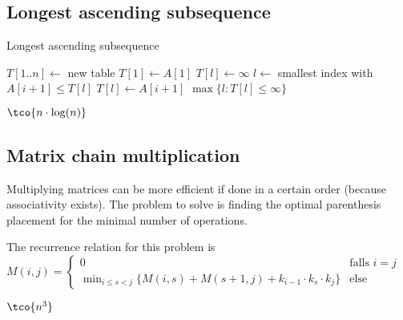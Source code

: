 \subsection{Longest ascending subsequence}
\begin{algorithm}
    \begin{spacing}{1.2}
        \caption{Longest ascending subsequence}
        \begin{algorithmic}[1]
            \State $T[1..n] \gets$ new table
            \State $T[1] \gets A[1]$
                $T[l] \gets \infty$
            \EndFor
                \State $l \gets$ smallest index with $A[i + 1] \leq T[l]$
                \State $T[l] \gets A[i + 1]$
            \EndFor
            \State \Return $\max\{l : T[l] \leq \infty\}$
        \end{algorithmic}
    \end{spacing}
\end{algorithm}

\timecomplexity $\tco{n \cdot \log(n)}$


\subsection{Matrix chain multiplication}
Multiplying matrices can be more efficient if done in a certain order (because associativity exists). The problem to solve is finding the optimal parenthesis placement for the minimal number of operations. 

The recurrence relation for this problem is $M(i, j) = \begin{cases}
    0 & \text{falls } i = j\\
    \min_{i \leq s < j}\{M(i, s) + M(s + 1, j) + k_{i - 1}\cdot k_s \cdot k_j\} & \text{else}
\end{cases}$


\timecomplexity $\tco{n^3}$

